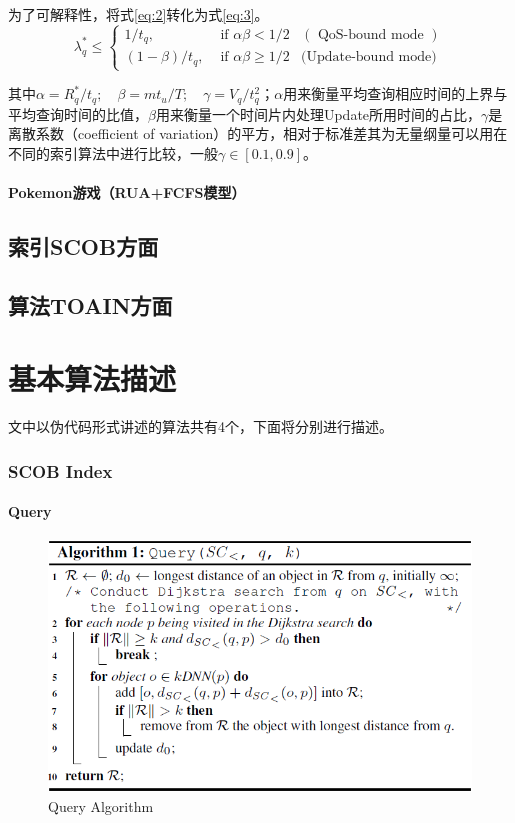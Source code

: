 \documentclass{ML}
\begin{document}
为了可解释性，将式\eqref{eq:2}转化为式\eqref{eq:3}。
\begin{equation}
\lambda_{q}^{*} \leq \left\{
\begin{array}{lll}
{1 / t_{q},} & {\text { if } \alpha \beta<1 / 2} & {(\text { QoS-bound mode })} \\ 
{(1-\beta) / t_{q},} & {\text { if } \alpha \beta \geq 1 / 2} &\text {(Update-bound mode)}
\end{array}
\right.
\label{eq:3}
\end{equation}

其中$\alpha=R_{q}^{*} / t_{q} ; \quad \beta=m t_{u} / T ; \quad \gamma=V_{q} / t_{q}^{2}$；$\alpha$用来衡量平均查询相应时间的上界与平均查询时间的比值，$\beta$用来衡量一个时间片内处理Update所用时间的占比，$\gamma$是离散系数（coefficient of variation）的平方，相对于标准差其为无量纲量可以用在不同的索引算法中进行比较，一般$\gamma \in [0.1, 0.9]$。	

\paragraph{Pokemon游戏（RUA+FCFS模型）}
\subsection{索引SCOB方面}
\subsection{算法TOAIN方面}
\section{基本算法描述}
文中以伪代码形式讲述的算法共有4个，下面将分别进行描述。
\subsubsection{SCOB Index}
\paragraph{Query}
\begin{figure}[htb]
	\centering
	\includegraphics[width=0.8\linewidth]{media/query.png}
	\caption{Query Algorithm}\label{fig:query}
\end{figure}
\end{document}
